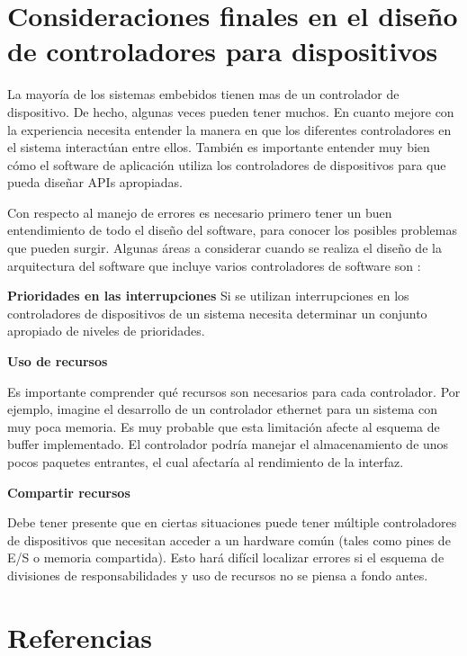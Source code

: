 \documentclass[output=paper, 
colorlinks,
citecolor=brown,
newtxmath
]{langscibook}
\begin{document}
\section {Consideraciones finales en el diseño de controladores para dispositivos}

La mayoría de los sistemas embebidos tienen mas de un controlador de dispositivo.
De hecho, algunas veces pueden tener muchos. En cuanto
mejore con la experiencia necesita entender la manera en que los
diferentes controladores en el sistema interactúan entre ellos. 
También es importante entender muy bien cómo el software de aplicación 
utiliza los controladores de dispositivos para que pueda diseñar APIs apropiadas.

Con respecto al manejo de errores es necesario primero tener un 
buen entendimiento de todo el diseño
del software, para conocer los posibles problemas que pueden surgir.
Algunas áreas a considerar cuando se realiza el diseño de la arquitectura
del software que incluye varios controladores de software son :

\textbf{Prioridades en las interrupciones}
Si se utilizan interrupciones en los controladores de dispositivos
de un sistema necesita determinar un conjunto apropiado de niveles
de prioridades.


\textbf{Uso de recursos}

Es importante comprender qué recursos son necesarios para cada controlador.
Por ejemplo, imagine el desarrollo de un controlador ethernet para un 
sistema con muy poca memoria.
Es muy probable que esta limitación afecte al esquema de buffer implementado.
El controlador podría manejar el almacenamiento de unos
pocos paquetes entrantes, el cual afectaría al rendimiento de la 
interfaz.

\textbf{Compartir recursos}

Debe tener presente que en ciertas situaciones puede tener múltiple
controladores de dispositivos que necesitan acceder a un hardware común 
(tales como pines de E/S o memoria compartida).
Esto hará difícil localizar errores si el
esquema de divisiones de responsabilidades y uso de recursos
no se piensa a fondo antes.











 
\section{Referencias}
\end{document}
